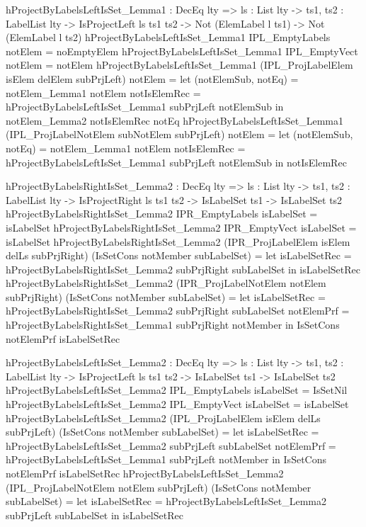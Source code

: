 \begin{code}
hProjectByLabelsLeftIsSet_Lemma1 : DecEq lty => {ls : List lty} -> 
  {ts1, ts2 : LabelList lty} -> IsProjectLeft ls ts1 ts2 -> 
  Not (ElemLabel l ts1) -> Not (ElemLabel l ts2)
hProjectByLabelsLeftIsSet_Lemma1 IPL_EmptyLabels notElem = 
  noEmptyElem
hProjectByLabelsLeftIsSet_Lemma1 IPL_EmptyVect notElem = notElem
hProjectByLabelsLeftIsSet_Lemma1 (IPL_ProjLabelElem isElem 
  delElem subPrjLeft) notElem = 
  let
    (notElemSub, notEq) = notElem_Lemma1 notElem
    notIsElemRec = 
      hProjectByLabelsLeftIsSet_Lemma1 subPrjLeft notElemSub
  in notElem_Lemma2 notIsElemRec notEq  
hProjectByLabelsLeftIsSet_Lemma1 (IPL_ProjLabelNotElem subNotElem 
  subPrjLeft) notElem =
  let
    (notElemSub, notEq) = notElem_Lemma1 notElem
    notIsElemRec = 
      hProjectByLabelsLeftIsSet_Lemma1 subPrjLeft notElemSub
  in notIsElemRec

hProjectByLabelsRightIsSet_Lemma2 : DecEq lty => {ls : List lty} -> 
  {ts1, ts2 : LabelList lty} -> IsProjectRight ls ts1 ts2 -> 
  IsLabelSet ts1 -> IsLabelSet ts2
hProjectByLabelsRightIsSet_Lemma2 IPR_EmptyLabels isLabelSet = 
  isLabelSet         
hProjectByLabelsRightIsSet_Lemma2 IPR_EmptyVect isLabelSet = 
  isLabelSet         
hProjectByLabelsRightIsSet_Lemma2 (IPR_ProjLabelElem isElem delLs 
  subPrjRight) (IsSetCons notMember subLabelSet) =
  let isLabelSetRec = 
    hProjectByLabelsRightIsSet_Lemma2 subPrjRight subLabelSet
  in isLabelSetRec 
hProjectByLabelsRightIsSet_Lemma2 (IPR_ProjLabelNotElem notElem 
  subPrjRight) (IsSetCons notMember subLabelSet) = 
  let isLabelSetRec = 
        hProjectByLabelsRightIsSet_Lemma2 subPrjRight subLabelSet
      notElemPrf = 
        hProjectByLabelsRightIsSet_Lemma1 subPrjRight notMember 
  in IsSetCons notElemPrf isLabelSetRec
   
hProjectByLabelsLeftIsSet_Lemma2 : DecEq lty => {ls : List lty} -> 
  {ts1, ts2 : LabelList lty} -> IsProjectLeft ls ts1 ts2 -> 
  IsLabelSet ts1 -> IsLabelSet ts2
hProjectByLabelsLeftIsSet_Lemma2 IPL_EmptyLabels isLabelSet = 
  IsSetNil
hProjectByLabelsLeftIsSet_Lemma2 IPL_EmptyVect isLabelSet = 
  isLabelSet
hProjectByLabelsLeftIsSet_Lemma2 (IPL_ProjLabelElem isElem delLs 
  subPrjLeft) (IsSetCons notMember subLabelSet) = 
  let isLabelSetRec = 
        hProjectByLabelsLeftIsSet_Lemma2 subPrjLeft subLabelSet
      notElemPrf = 
        hProjectByLabelsLeftIsSet_Lemma1 subPrjLeft notMember
  in IsSetCons notElemPrf isLabelSetRec
hProjectByLabelsLeftIsSet_Lemma2 (IPL_ProjLabelNotElem notElem 
  subPrjLeft) (IsSetCons notMember subLabelSet) = 
  let isLabelSetRec = 
        hProjectByLabelsLeftIsSet_Lemma2 subPrjLeft subLabelSet
  in isLabelSetRec 
    

\end{code}
